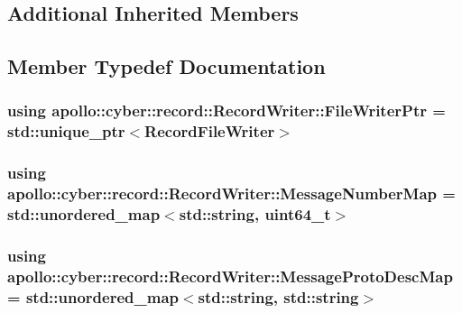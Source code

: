 \subsection*{Additional Inherited Members}


\subsection{Member Typedef Documentation}
\hypertarget{classapollo_1_1cyber_1_1record_1_1RecordWriter_a9711b0e51bbbd4dbe54e44c3d1fbd9da}{
\subsubsection[{File\-Writer\-Ptr}]{\setlength{\rightskip}{0pt plus 5cm}using {\bf apollo\-::cyber\-::record\-::\-Record\-Writer\-::\-File\-Writer\-Ptr} =  std\-::unique\-\_\-ptr$<${\bf Record\-File\-Writer}$>$}}\label{classapollo_1_1cyber_1_1record_1_1RecordWriter_a9711b0e51bbbd4dbe54e44c3d1fbd9da}
\hypertarget{classapollo_1_1cyber_1_1record_1_1RecordWriter_a2eee5f400e4db03ec9101258d8e819ab}{
\subsubsection[{Message\-Number\-Map}]{\setlength{\rightskip}{0pt plus 5cm}using {\bf apollo\-::cyber\-::record\-::\-Record\-Writer\-::\-Message\-Number\-Map} =  std\-::unordered\-\_\-map$<$std\-::string, uint64\-\_\-t$>$}}\label{classapollo_1_1cyber_1_1record_1_1RecordWriter_a2eee5f400e4db03ec9101258d8e819ab}
\hypertarget{classapollo_1_1cyber_1_1record_1_1RecordWriter_a19879e77c64a35d8e8d49d39798c25cb}{
\subsubsection[{Message\-Proto\-Desc\-Map}]{\setlength{\rightskip}{0pt plus 5cm}using {\bf apollo\-::cyber\-::record\-::\-Record\-Writer\-::\-Message\-Proto\-Desc\-Map} =  std\-::unordered\-\_\-map$<$std\-::string, std\-::string$>$}}\label{classapollo_1_1cyber_1_1record_1_1RecordWriter_a19879e77c64a35d8e8d49d39798c25cb}
